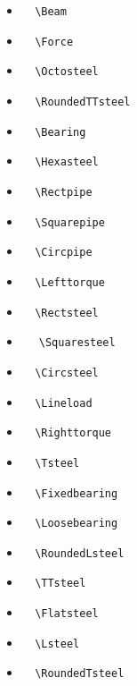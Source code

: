 	\begin{itemize}
		\item	\Beam		\verb|	\Beam	|
		\item	\Force		\verb|	\Force	|
		\item	\Octosteel		\verb|	\Octosteel	|
		\item	\RoundedTTsteel		\verb|	\RoundedTTsteel	|
		\item	\Bearing		\verb|	\Bearing	|
		\item	\Hexasteel		\verb|	\Hexasteel	|
		\item	\Rectpipe		\verb|	\Rectpipe	|
		\item	\Squarepipe		\verb|	\Squarepipe	|
		\item	\Circpipe		\verb|	\Circpipe	|
		\item	\Lefttorque		\verb|	\Lefttorque	|
		\item	\Rectsteel		\verb|	\Rectsteel	|
		\item	\Squaresteel		\verb|	\Squaresteel	|
		\item	\Circsteel		\verb|	\Circsteel	|
		\item	\Lineload		\verb|	\Lineload	|
		\item	\Righttorque		\verb|	\Righttorque	|
		\item	\Tsteel		\verb|	\Tsteel	|
		\item	\Fixedbearing		\verb|	\Fixedbearing	|
		\item	\Loosebearing		\verb|	\Loosebearing	|
		\item	\RoundedLsteel		\verb|	\RoundedLsteel	|
		\item	\TTsteel		\verb|	\TTsteel	|
		\item	\Flatsteel		\verb|	\Flatsteel	|
		\item	\Lsteel		\verb|	\Lsteel	|
		\item	\RoundedTsteel		\verb|	\RoundedTsteel	|
	\end{itemize}














